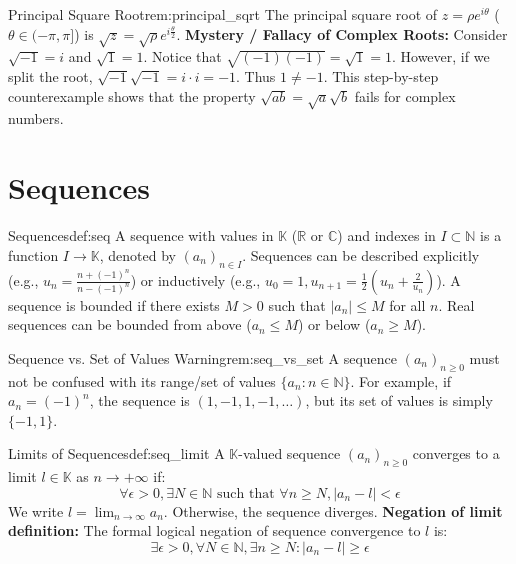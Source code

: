 \documentclass[11pt, a4paper]{article}
\begin{document}
\begin{remark}{Principal Square Root}{rem:principal_sqrt}
The principal square root of $z = \rho e^{i\theta}$ ($\theta \in (-\pi, \pi]$) is $\sqrt{z} = \sqrt{\rho} e^{i\frac{\theta}{2}}$.
\textbf{Mystery / Fallacy of Complex Roots:}
Consider $\sqrt{-1} = i$ and $\sqrt{1} = 1$.
Notice that $\sqrt{(-1)(-1)} = \sqrt{1} = 1$.
However, if we split the root, $\sqrt{-1}\sqrt{-1} = i \cdot i = -1$.
Thus $1 \neq -1$. This step-by-step counterexample shows that the property $\sqrt{ab} = \sqrt{a}\sqrt{b}$ fails for complex numbers.
\end{remark}

\section{Sequences}

\begin{definition}{Sequences}{def:seq}
A sequence with values in $\mathbb{K}$ ($\mathbb{R}$ or $\mathbb{C}$) and indexes in $I \subset \mathbb{N}$ is a function $I \to \mathbb{K}$, denoted by $(a_n)_{n \in I}$. Sequences can be described explicitly (e.g., $u_n = \frac{n+(-1)^n}{n-(-1)^n}$) or inductively (e.g., $u_0 = 1, u_{n+1} = \frac{1}{2}(u_n + \frac{2}{u_n})$). A sequence is bounded if there exists $M > 0$ such that $|a_n| \le M$ for all $n$. Real sequences can be bounded from above ($a_n \le M$) or below ($a_n \ge M$).
\end{definition}

\begin{remark}{Sequence vs. Set of Values Warning}{rem:seq_vs_set}
A sequence $(a_n)_{n \ge 0}$ must not be confused with its range/set of values $\{a_n : n \in \mathbb{N}\}$. For example, if $a_n = (-1)^n$, the sequence is $(1, -1, 1, -1, \dots)$, but its set of values is simply $\{-1, 1\}$.
\end{remark}

\begin{definition}{Limits of Sequences}{def:seq_limit}
A $\mathbb{K}$-valued sequence $(a_n)_{n \ge 0}$ converges to a limit $l \in \mathbb{K}$ as $n \to +\infty$ if:
$$ \forall \epsilon > 0, \exists N \in \mathbb{N} \text{ such that } \forall n \ge N, |a_n - l| < \epsilon $$
We write $l = \lim_{n \to \infty} a_n$. Otherwise, the sequence diverges.
\textbf{Negation of limit definition:} The formal logical negation of sequence convergence to $l$ is:
$$ \exists \epsilon > 0, \forall N \in \mathbb{N}, \exists n \ge N : |a_n - l| \ge \epsilon $$
\end{definition}
\end{document}
